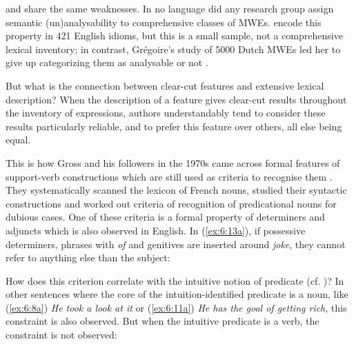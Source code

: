 \documentclass[output=paper]{langsci/langscibook}
\begin{document}
\cite{Sag:2002}  and \cite{Baldwin2010} share the same weaknesses. In no language did any research group assign semantic (un)analysability to comprehensive classes of MWEs. \cite[64]{Bond}  encode this property in 421 English idioms, but this is a small sample, not a comprehensive lexical inventory; in contrast, Grégoire’s study of 5000  Dutch MWEs led her to give up categorizing them as analysable or not \citep[31--32]{Gregoire2010}.

But what is the connection between clear-cut features and extensive lexical description? When the description of a feature gives clear-cut results throughout the inventory of expressions, authors understandably tend to consider these results particularly reliable, and to prefer this feature over others, all else being equal.

This is how Gross and his followers in the 1970s came across formal features of support-verb constructions which are still used as criteria to recognise them \citep{Langer2005}. They systematically scanned  the lexicon of French nouns, studied their syntactic constructions and worked out criteria of recognition of predicational nouns for dubious cases. One of these criteria is a formal property of determiners and adjuncts \citep[109]{Gross1976} which is also observed in English. In (\ref{ex:6:13a}), if possessive determiners, phrases with \textit{of} and genitives are inserted around \textit{joke}, they cannot refer to anything else than the subject:


\begin{exe}
\ex \label{ex:6:13}
\begin{xlist}
 \end{xlist}
\end{exe}

How does this criterion correlate with the intuitive notion of predicate (cf. )? In other sentences where the core of the intuition-identified predicate is a noun, like (\ref{ex:6:8a}) \textit{He took a look at it} or (\ref{ex:6:11a}) \textit{He has the goal of getting rich}, this constraint is also observed. But when the intuitive predicate is a verb, the constraint is not observed:


\begin{exe}
\ex \label{ex:6:14}
\begin{xlist}
\end{xlist}
\end{exe}
\end{document}
